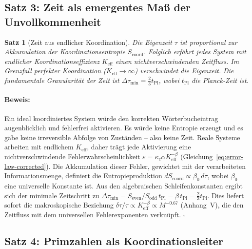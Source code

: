 \documentclass[12pt,a4paper]{article}
\newtheorem{theorem}{Satz}[section]
\theoremstyle{remark}
\renewenvironment{proof}{\paragraph{Beweis:}}{\hfill$\square$}
\newcommand{\tPl}{t_{\mathrm{Pl}}}
\newcommand{\Scoord}{S_{\mathrm{coord}}}
\begin{document}
	\subsection{Satz 3: Zeit als emergentes Maß der Unvollkommenheit}
	
	\begin{theorem}[Zeit aus endlicher Koordination]
		\label{thm:time}
		Die Eigenzeit \(\tau\) ist proportional zur Akkumulation der Koordinationsentropie
		\(\Scoord\). Folglich erfährt jedes System mit endlicher Koordinationseffizienz
		\(K_{\mathrm{eff}}\) einen nichtverschwindenden Zeitfluss. Im Grenzfall
		perfekter Koordination (\(K_{\mathrm{eff}} \to \infty\)) verschwindet die
		Eigenzeit. Die fundamentale Granularität der Zeit ist
		\(\Delta \tau_{\min} = \frac{2}{3} \tPl\), wobei \(\tPl\) die Planck-Zeit ist.
	\end{theorem}
	
	\begin{proof}
		Ein ideal koordiniertes System würde den korrekten Wörterbucheintrag
		augenblicklich und fehlerfrei aktivieren. Es würde keine Entropie erzeugt
		und es gäbe keine irreversible Abfolge von Zuständen -- also keine Zeit.
		Reale Systeme arbeiten mit endlichem \(K_{\mathrm{eff}}\), daher trägt jede
		Aktivierung eine nichtverschwindende Fehlerwahrscheinlichkeit
		\(\varepsilon = \kappa_c \alpha K_{\mathrm{eff}}^{-\beta}\)
		(Gleichung~\ref{eq:error-law-corrected}). Die Akkumulation dieser Fehler,
		gewichtet mit der verarbeiteten Informationsmenge, definiert die
		Entropieproduktion \(d\Scoord \propto \beta_0 \, d\tau\), wobei \(\beta_0\)
		eine universelle Konstante ist. Aus den algebraischen Schleifenkonstanten
		ergibt sich der minimale Zeitschritt zu
		\(\Delta \tau_{\min} = S_{\mathrm{even}}/S_{\mathrm{odd}} \, \tPl
		= \beta \, \tPl = \frac{2}{3} \tPl\). Dies liefert sofort die
		makroskopische Beziehung \(\delta\tau/\tau \propto K_{\mathrm{eff}}^{-\beta}
		\propto M^{-0.67}\) (Anhang~V), die den Zeitfluss mit dem universellen
		Fehlerexponenten verknüpft.
	\end{proof}
	
	\subsection{Satz 4: Primzahlen als Koordinationsleiter}
	
\end{document}
